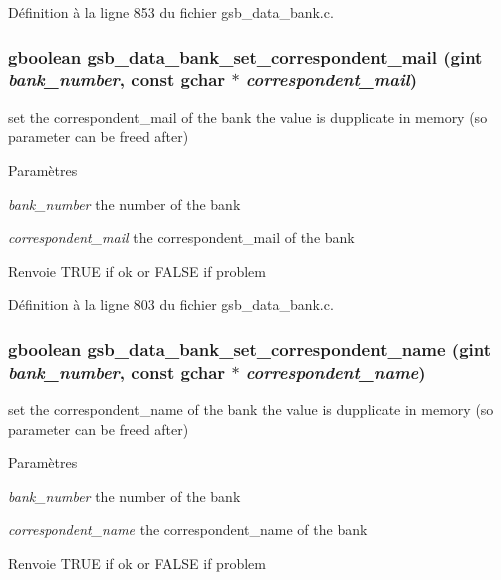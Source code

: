 Définition à la ligne 853 du fichier gsb\_\-data\_\-bank.c.

\subsubsection[{gsb\_\-data\_\-bank\_\-set\_\-correspondent\_\-mail}]{\setlength{\rightskip}{0pt plus 5cm}gboolean gsb\_\-data\_\-bank\_\-set\_\-correspondent\_\-mail (gint {\em bank\_\-number}, \/  const gchar $\ast$ {\em correspondent\_\-mail})}\label{gsb__data__bank_8c_a94d4c9895183a3ae80f9aa9844050876}
set the correspondent\_\-mail of the bank the value is dupplicate in memory (so parameter can be freed after)


\begin{DoxyParams}{Paramètres}
\item[{\em bank\_\-number}]the number of the bank \item[{\em correspondent\_\-mail}]the correspondent\_\-mail of the bank\end{DoxyParams}
\begin{DoxyReturn}{Renvoie}
TRUE if ok or FALSE if problem 
\end{DoxyReturn}


Définition à la ligne 803 du fichier gsb\_\-data\_\-bank.c.

\subsubsection[{gsb\_\-data\_\-bank\_\-set\_\-correspondent\_\-name}]{\setlength{\rightskip}{0pt plus 5cm}gboolean gsb\_\-data\_\-bank\_\-set\_\-correspondent\_\-name (gint {\em bank\_\-number}, \/  const gchar $\ast$ {\em correspondent\_\-name})}\label{gsb__data__bank_8c_a16525ec53d58eae12caa1f4c84eac4a1}
set the correspondent\_\-name of the bank the value is dupplicate in memory (so parameter can be freed after)


\begin{DoxyParams}{Paramètres}
\item[{\em bank\_\-number}]the number of the bank \item[{\em correspondent\_\-name}]the correspondent\_\-name of the bank\end{DoxyParams}
\begin{DoxyReturn}{Renvoie}
TRUE if ok or FALSE if problem 
\end{DoxyReturn}


